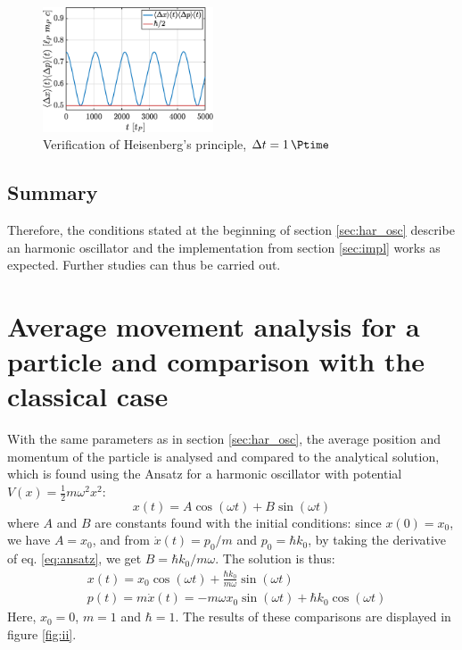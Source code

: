 \documentclass[a4paper,12pt,twoside]{article}
\begin{document}
    \begin{figure}[h]
      \centering
      \includegraphics[width=0.45\textwidth]{graphs/i_heisenberg.eps}
      \caption{Verification of Heisenberg's principle, $\Delta t = \SI{1}{\Ptime}$}
      \label{fig:i_heisenberg}
    \end{figure}

    \subsection{Summary}
    Therefore, the conditions stated at the beginning of section \ref{sec:har_osc} describe an harmonic oscillator and the implementation from section \ref{sec:impl} works as expected.
    Further studies can thus be carried out.


\newpage
\section{Average movement analysis for a particle and comparison with the classical case}

With the same parameters as in section \ref{sec:har_osc}, the average position and momentum of the particle is analysed and compared to the analytical solution, which is found using the Ansatz for a harmonic oscillator with potential $V(x)=\frac{1}{2}m\omega^2x^2$:
\begin{equation}
 x(t)=A \cos(\omega t) + B \sin(\omega t)
 \label{eq:ansatz}
\end{equation}
where $A$ and $B$ are constants found with the initial conditions: since $x(0)=x_0$, we have $A=x_0$, and from $\dot{x}(t)=p_0/m$ and $p_0=\hbar k_0$, by taking the derivative of eq. \eqref{eq:ansatz}, we get $B=\hbar k_0/m\omega$. The solution is thus:
\begin{align}
 &x(t)=x_0\cos(\omega t) + \frac{\hbar k_0}{m \omega} \sin(\omega t)\\
 &p(t)=m\dot{x}(t)=-m\omega x_0\sin(\omega t) + \hbar k_0 \cos(\omega t)
\end{align}
Here, $x_0=0$, $m=1$ and $\hbar=1$. The results of these comparisons are displayed in figure \ref{fig:ii}.
\end{document}
